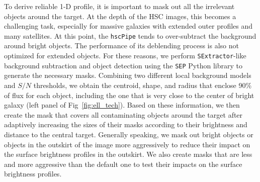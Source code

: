 \documentclass[a4paper,fleqn,usenatbib]{mnras}
\begin{document}
    To derive reliable 1-D profile, it is important to mask out all the irrelevant 
    objects around the target.
    At the depth of the HSC images, this becomes a challenging task, especially 
    for massive galaxies with extended outer profiles and many satellites. 
    At this point, the \texttt{hscPipe} tends to over-subtract the background around 
    bright objects.  
    The performance of its deblending process is also not optimized for extended
    objects. 
    For these reasons, we perform \texttt{SExtractor}-like background subtraction and 
    object detection using the \texttt{SEP} Python library to generate the necessary 
    masks.
    Combining two different local background models and $S/N$ thresholds, we obtain 
    the centroid, shape, and radius that enclose 90\% of flux for each object, 
    including the one that is very close to the center of bright galaxy (left panel of 
    Fig~\ref{fig:ell_tech}). 
    Based on these information, we then create the mask that covers all contaminating 
    objects around the target after adaptively increasing the sizes of their masks 
    according to their brightness and distance to the central target. 
    Generally speaking, we mask out bright objects or objects in the outskirt of the 
    image more aggressively to reduce their impact on the surface brightness profiles 
    in the outskirt. 
    We also create masks that are less and more aggressive than the default one to 
    test their impacts on the surface brightness profiles. 
    
\end{document}
